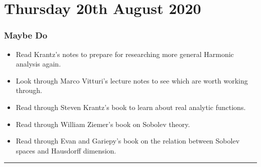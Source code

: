 \documentclass[openany,nobib,nols,a4paper,twoside,symmetric,justified,notoc]{tufte-book}
\theoremstyle{plain}
\theoremstyle{remark}
\theoremstyle{definition}
\newenvironment{maybedo}%
    {\subsection{Maybe Do}}%
    {\vspace{2mm}\hrule\hspace{\stretch{1}}\\}
\begin{document}
\chapter{Thursday 20th August 2020} \label{04062020}

\begin{maybedo}
    \begin{itemize}
        \item Read Krantz's notes \cite{Krantz2007} to prepare for researching more general Harmonic analysis again.

        \item Look through Marco Vitturi's lecture notes to see which are worth working through.

        \item Read through Steven Krantz's book \cite{Krantz2002} to learn about real analytic functions.

        \item Read through William Ziemer's book \cite{Ziemer1989} on Sobolev theory.

        \item Read through Evan and Gariepy's book \cite{Evans1992} on the relation between Sobolev spaces and Hausdorff dimension.
    \end{itemize}
\end{maybedo}
\end{document}
